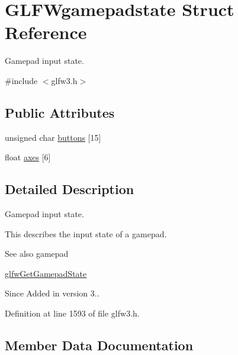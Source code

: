 \hypertarget{struct_g_l_f_wgamepadstate}{}\section{G\+L\+F\+Wgamepadstate Struct Reference}
\label{struct_g_l_f_wgamepadstate}


Gamepad input state.  




{\ttfamily \#include $<$glfw3.\+h$>$}

\subsection*{Public Attributes}
\begin{DoxyCompactItemize}
\item 
unsigned char \mbox{\hyperlink{struct_g_l_f_wgamepadstate_a27e9896b51c65df15fba2c7139bfdb9a}{buttons}} \mbox{[}15\mbox{]}
\item 
float \mbox{\hyperlink{struct_g_l_f_wgamepadstate_a8b2c8939b1d31458de5359998375c189}{axes}} \mbox{[}6\mbox{]}
\end{DoxyCompactItemize}


\subsection{Detailed Description}
Gamepad input state. 

This describes the input state of a gamepad.

\begin{DoxySeeAlso}{See also}
gamepad 

\mbox{\hyperlink{group__input_ga6e138d3b0761546f5a12546f367501d6}{glfw\+Get\+Gamepad\+State}}
\end{DoxySeeAlso}
\begin{DoxySince}{Since}
Added in version 3.. 
\end{DoxySince}


Definition at line 1593 of file glfw3.\+h.



\subsection{Member Data Documentation}
\mbox{\label{struct_g_l_f_wgamepadstate_a8b2c8939b1d31458de5359998375c189}} 
